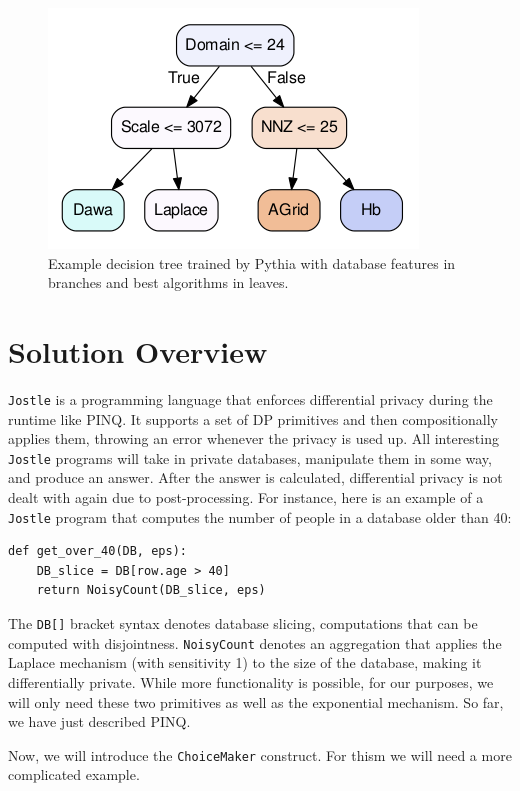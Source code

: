 \documentclass[11pt]{report}
\newcommand{\Jostle}{\texttt{Jostle}}
\renewcommand{\t}[1]{\texttt{#1}}
\begin{document}
\begin{figure}
\begin{center}
\includegraphics[scale=0.5]{PythiaDTree}
\end{center}
\caption{Example decision tree trained by Pythia with database features in branches and best algorithms in leaves.}\label{fig:pythia}
\end{figure}

\chapter{Solution Overview}\label{ch:solution}
\Jostle{} is a programming language that enforces differential privacy during the runtime like PINQ. It supports a set of DP primitives and then compositionally applies them, throwing an error whenever the privacy is used up. All interesting \Jostle{} programs will take in private databases, manipulate them in some way, and produce an answer. After the answer is calculated, differential privacy is not dealt with again due to post-processing. For instance, here is an example of a \Jostle{} program that computes the number of people in a database older than 40:
\begin{lstlisting}[style=MyPythonStyle]
def get_over_40(DB, eps):
    DB_slice = DB[row.age > 40]
    return NoisyCount(DB_slice, eps) 
\end{lstlisting}
The \t{DB[]} bracket syntax denotes database slicing, computations that can be computed with disjointness. \t{NoisyCount} denotes an aggregation that applies the Laplace mechanism (with sensitivity 1) to the size of the database, making it differentially private. While more functionality is possible, for our purposes, we will only need these two primitives as well as the exponential mechanism. So far, we have just described PINQ.

Now, we will introduce the \t{ChoiceMaker} construct. For thism we will need a more complicated example.
\end{document}

